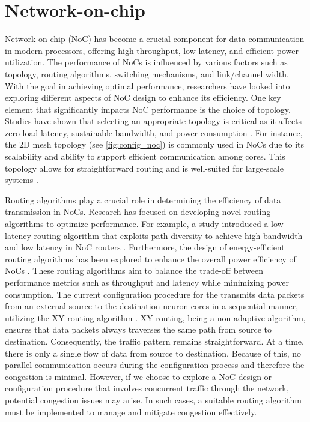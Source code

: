 \section{Network-on-chip}
Network-on-chip (NoC) has become a crucial component for data communication in modern processors, offering high throughput, low latency, and efficient power utilization.
The performance of NoCs is influenced by various factors such as topology, routing algorithms, switching mechanisms, and link/channel width.
With the goal in achieving optimal performance, researchers have looked into exploring different aspects of NoC design to enhance its efficiency.
One key element that significantly impacts NoC performance is the choice of topology.
Studies have shown that selecting an appropriate topology is critical as it affects zero-load latency, sustainable bandwidth, and power consumption \cite{chenPhysicalVsVirtual2010}.
For instance, the 2D mesh topology (see \cref{fig:config_noc}) is commonly used in NoCs due to its scalability and ability to support efficient communication among cores.
This topology allows for straightforward routing and is well-suited for large-scale systems \cite{sanchezAnalysisOnchipInterconnection2010}. 

Routing algorithms play a crucial role in determining the efficiency of data transmission in NoCs.
Research has focused on developing novel routing algorithms to optimize performance.
For example, a study introduced a low-latency routing algorithm that exploits path diversity to achieve high bandwidth and low latency in NoC routers \cite{yangExploitingPathDiversity2012}.
Furthermore, the design of energy-efficient routing algorithms has been explored to enhance the overall power efficiency of NoCs \cite{parikhPowerAwareNoCsRouting2014}.
These routing algorithms aim to balance the trade-off between performance metrics such as throughput and latency while minimizing power consumption.
The current configuration procedure for the \graicore{} transmits data packets from an external source to the destination neuron cores in a sequential manner, utilizing the XY routing algorithm \cite{glassTurnModelAdaptive1992}.
XY routing, being a non-adaptive algorithm, ensures that data packets always traverses the same path from source to destination.
Consequently, the traffic pattern remains straightforward.
At a time, there is only a single flow of data from source to destination.
Because of this, no parallel communication occurs during the configuration process and therefore the congestion is minimal.
However, if we choose to explore a NoC design or configuration procedure that involves concurrent traffic through the network, potential congestion issues may arise.
In such cases, a suitable routing algorithm must be implemented to manage and mitigate congestion effectively.

